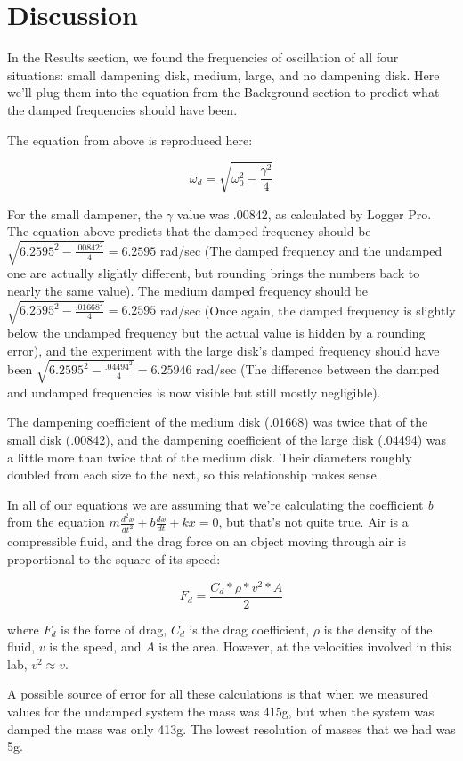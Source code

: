 \documentclass[]{article}
\begin{document}
\section{Discussion}

In the Results section, we found the frequencies of oscillation of all four situations: small dampening disk, medium, large, and no dampening disk. Here we'll plug them into the equation from the Background section to predict what the damped frequencies should have been.

The equation from above is reproduced here:

\begin{equation}
\omega_d = \sqrt{\omega_0 ^2 - \frac{\gamma^2}{4}}
\end{equation}

For the small dampener, the $\gamma$ value was .00842, as calculated by Logger Pro. The equation above predicts that the damped frequency should be $\sqrt{6.2595^2 - \frac{.00842^2}{4}} = 6.2595$ rad/sec (The damped frequency and the undamped one are actually slightly different, but rounding brings the numbers back to nearly the same value). The medium damped frequency should be $\sqrt{6.2595^2 - \frac{.01668^2}{4}} = 6.2595$ rad/sec (Once again, the damped frequency is slightly below the undamped frequency but the actual value is hidden by a rounding error), and the experiment with the large disk's damped frequency should have been $\sqrt{6.2595^2 - \frac{.04494^2}{4}} = 6.25946$ rad/sec (The difference between the damped and undamped frequencies is now visible but still mostly negligible).

The dampening coefficient of the medium disk (.01668) was twice that of the small disk (.00842), and the dampening coefficient of the large disk (.04494) was a little more than twice that of the medium disk. Their diameters roughly doubled from each size to the next, so this relationship makes sense.


In all of our equations we are assuming that we're calculating the coefficient \textit{b} from the equation $m \frac{d^2 x}{dt^2} + b \frac{dx}{dt} + kx = 0$, but that's not quite true. Air is a compressible fluid, and the drag force on an object moving through air is proportional to the square of its speed: 

\begin{equation}
F_d = \frac{C_d * \rho * v^2 * A}{2}
\end{equation}


 where $F_d$ is the force of drag, $C_d$ is the drag coefficient, $\rho$ is the density of the fluid, $v$ is the speed, and $A$ is the area. However, at the velocities involved in this lab, $v^2 \approx v$.


A possible source of error for all these calculations is that when we measured values for the undamped system the mass was 415g, but when the system was damped the mass was only 413g. The lowest resolution of masses that we had was 5g.
\end{document}
